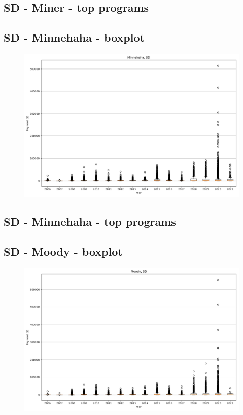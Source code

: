 \subsection*{SD - Miner - top programs}

\newpage
\subsection*{SD - Minnehaha - boxplot}
\begin{figure}[h]
\centering
\includegraphics[width=7in]{../output/boxplots/counties/Minnehaha-SD_boxplot.png}
\end{figure}


\subsection*{SD - Minnehaha - top programs}

\newpage
\subsection*{SD - Moody - boxplot}
\begin{figure}[h]
\centering
\includegraphics[width=7in]{../output/boxplots/counties/Moody-SD_boxplot.png}
\end{figure}


